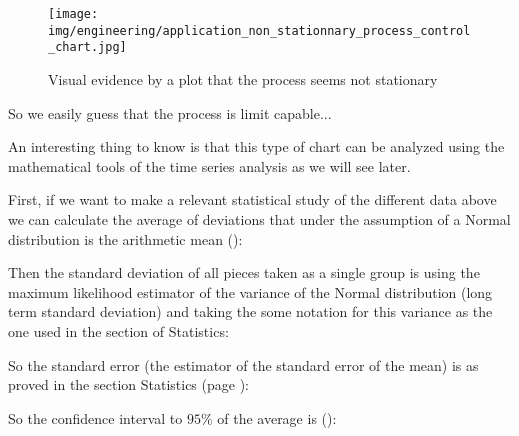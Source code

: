 	\pagebreak
	\begin{tcolorbox}[colframe=black,colback=white,sharp corners]
	\begin{figure}[H]
		\centering
		\texttt{[image: img/engineering/application\_non\_stationnary\_process\_control\_chart.jpg]}
		\caption[]{Visual evidence by a plot that the process seems not stationary}
	\end{figure}
	So we easily guess that the process is limit capable...
	\begin{tcolorbox}[title=Remark,colframe=black,arc=10pt]
	An interesting thing to know is that this type of chart can be analyzed using the mathematical tools of the time series analysis as we will see later.
	\end{tcolorbox}
	First, if we want to make a relevant statistical study of the different data above we can calculate the average of deviations that under the assumption of a Normal distribution is the arithmetic mean ():
	
	Then the standard deviation of all pieces taken as a single group is using the maximum likelihood estimator of the variance of the Normal distribution (long term standard deviation) and taking the some notation for this variance as the one used in the section of Statistics:
	
	So the standard error  (the estimator of the standard error of the mean)  is as proved in the section Statistics (page \pageref{standard error}):
	
	So the confidence interval to $95\%$ of the average is ():
	
	\end{tcolorbox}
	
